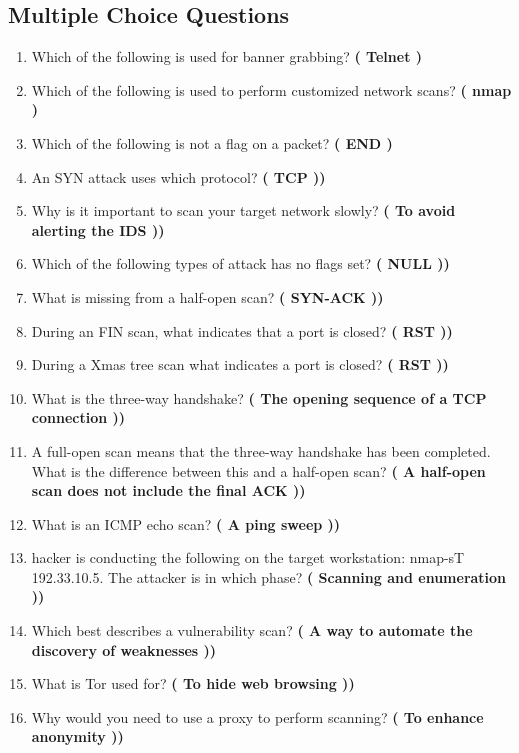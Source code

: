 \subsection{Multiple Choice Questions}
\begin{enumerate}
    \item Which of the following is used for banner grabbing? \textbf{\left( Telnet \right)}
    \item Which of the following is used to perform customized network scans? \textbf{\left( nmap \right)}
    \item Which of the following is not a flag on a packet? \textbf{\left( END \right)}
    \item An SYN attack uses which protocol? \textbf{\left( TCP \right))}
    \item Why is it important to scan your target network slowly? \textbf{\left( To avoid alerting the IDS \right))}
    \item Which of the following types of attack has no flags set? \textbf{\left( NULL \right))}
    \item What is missing from a half-open scan? \textbf{\left( SYN-ACK \right))}
    \item During an FIN scan, what indicates that a port is closed? \textbf{\left( RST \right))}
    \item During a Xmas tree scan what indicates a port is closed? \textbf{\left( RST \right))}
    \item What is the three-way handshake? \textbf{\left( The opening sequence of a TCP connection \right))}
    \item A full-open scan means that the three-way handshake has been completed. What is the difference between this and a half-open scan? \textbf{\left( A half-open scan does not include the final ACK \right))}
    \item What is an ICMP echo scan? \textbf{\left( A ping sweep \right))}
    \item hacker is conducting the following on the target workstation: nmap-sT 192.33.10.5. The attacker is in which phase? \textbf{\left( Scanning and enumeration \right))}
    \item Which best describes a vulnerability scan? \textbf{\left( A way to automate the discovery of weaknesses \right))}
    \item What is Tor used for? \textbf{\left( To hide web browsing \right))}
    \item Why would you need to use a proxy to perform scanning? \textbf{\left( To enhance anonymity \right))}

\end{enumerate}
